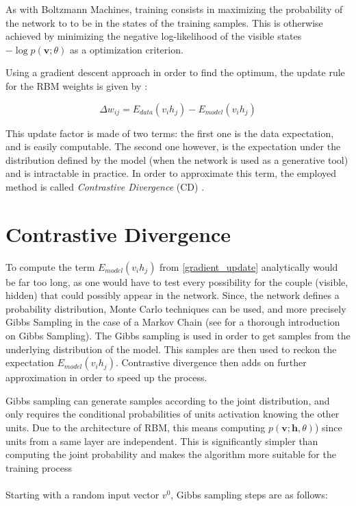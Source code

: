 \documentclass{report}
\begin{document}
	As with Boltzmann Machines, training consists in maximizing the probability of 
	the network to to be in the states of the training samples. This is otherwise 
	achieved by minimizing the negative log-likelihood of the visible states 
	$-\log p (\textbf{v}; \theta)$ as a optimization criterion. 
	
	Using a gradient descent approach in order to find the optimum, the update 
	rule for the RBM weights is given by \cite{nagatani2014restricted}:
	
	\vspace{0.5cm}
	\begin{equation} \label{gradient_update}
	\Delta w_{ij} = E_{data}(v_i h_j) - E_{model}(v_i h_j) 
	\end{equation}
	\vspace{0.5cm}
	
	This update factor is made of two terms: the first one is the data expectation, 
	and is easily computable. The second one however, is the expectation under the 
	distribution defined by the model (when the network is used as a generative 
	tool) and is intractable in practice. In order to approximate this term, the 
	employed method is called \textit{Contrastive Divergence} 
	(CD) \cite{hinton2006fast}.
	
	\section{Contrastive Divergence}
	
	To compute the term $E_{model}(v_i h_j)$ from \ref{gradient_update} 
	analytically would be far too long, as one would have to test every possibility 
	for the couple (visible, hidden) that could possibly appear in the network. 
	Since, the network defines a probability distribution, Monte Carlo techniques 
	can be used, and more precisely Gibbs Sampling in the case of a Markov Chain 
	(see \cite{resnik2010gibbs} for a thorough introduction on Gibbs Sampling). The 
	Gibbs sampling is used in order to get samples from the underlying distribution 
	of the model. This samples are then used to reckon the expectation 
	$E_{model}(v_i h_j)$. Contrastive divergence then adds on further approximation 
	in order to speed up the process.
	
	Gibbs sampling can generate samples according to the joint distribution, and 
	only requires the conditional probabilities of units activation knowing the 
	other units. Due to the architecture of RBM, this 
	means computing $p(\textbf{v}; \textbf{h}, \theta)$) since units from a same layer are independent. This is significantly 
	simpler than computing the joint probability and makes the algorithm more 
	suitable for the training process
	\\\\
	Starting with a random input vector $v^0$, Gibbs sampling steps are as follows:
	
\end{document}
